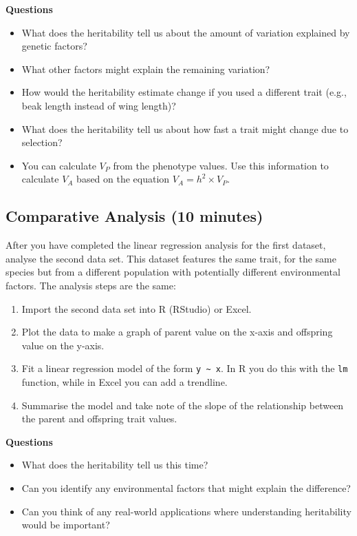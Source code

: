 \documentclass[
  a4paper]{book}
\providecommand{\tightlist}{%
  \setlength{\itemsep}{0pt}\setlength{\parskip}{0pt}}
\begin{document}
\textbf{Questions}

\begin{itemize}
\tightlist
\item
  What does the heritability tell us about the amount of variation explained by genetic factors?
\item
  What other factors might explain the remaining variation?
\item
  How would the heritability estimate change if you used a different trait (e.g., beak length instead of wing length)?
\item
  What does the heritability tell us about how fast a trait might change due to selection?
\item
  You can calculate \(V_P\) from the phenotype values. Use this information to calculate \(V_A\) based on the equation \(V_A = h^2 \times V_P\).
\end{itemize}

\subsection{Comparative Analysis (10 minutes)}\label{comparative-analysis-10-minutes}

After you have completed the linear regression analysis for the first dataset, analyse the second data set. This dataset features the same trait, for the same species but from a different population with potentially different environmental factors. The analysis steps are the same:

\begin{enumerate}
\def\labelenumi{\arabic{enumi})}
\tightlist
\item
  Import the second data set into R (RStudio) or Excel.
\item
  Plot the data to make a graph of parent value on the x-axis and offspring value on the y-axis.
\item
  Fit a linear regression model of the form \texttt{y\ \textasciitilde{}\ x}. In R you do this with the \texttt{lm} function, while in Excel you can add a trendline.
\item
  Summarise the model and take note of the slope of the relationship between the parent and offspring trait values.
\end{enumerate}

\textbf{Questions}

\begin{itemize}
\tightlist
\item
  What does the heritability tell us this time?
\item
  Can you identify any environmental factors that might explain the difference?
\item
  Can you think of any real-world applications where understanding heritability would be important?
\end{itemize}
\end{document}
